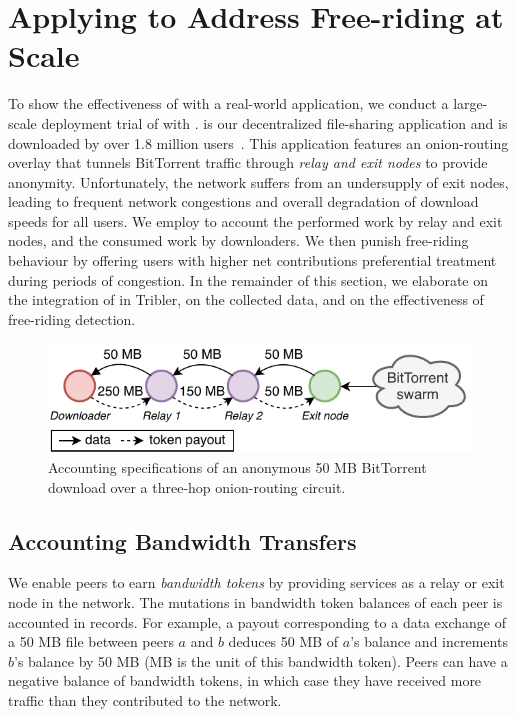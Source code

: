 \section{Applying \TrustChain{} to Address Free-riding at Scale}
\label{sec:deployment}
To show the effectiveness of \TrustChain{} with a real-world application, we conduct a large-scale deployment trial of \TrustChain{} with \Tribler{}.
\Tribler{} is our decentralized file-sharing application and is downloaded by over 1.8 million users~\cite{pouwelse2008tribler}.
This application features an onion-routing overlay that tunnels BitTorrent traffic through \emph{relay and exit nodes} to provide anonymity.
Unfortunately, the \Tribler{} network suffers from an undersupply of exit nodes, leading to frequent network congestions and overall degradation of download speeds for all users.
We employ \TrustChain{} to account the performed work by relay and exit nodes, and the consumed work by downloaders.
We then punish free-riding behaviour by offering users with higher net contributions preferential treatment during periods of congestion.
In the remainder of this section, we elaborate on the integration of \TrustChain{} in Tribler, on the collected data, and on the effectiveness of free-riding detection.

\begin{figure}[t]
	\centering
	\includegraphics[width=.8\linewidth]{trustchain/assets/payouts}
	\caption{Accounting specifications of an anonymous 50 MB BitTorrent download over a three-hop onion-routing circuit.}
	\label{fig:payouts}
\end{figure}

\subsection{Accounting Bandwidth Transfers}
We enable peers to earn \emph{bandwidth tokens} by providing services as a relay or exit node in the \Tribler{} network.
The mutations in bandwidth token balances of each peer is accounted in \TrustChain{} records.
For example, a payout corresponding to a data exchange of a 50 MB file between peers $ a $ and $ b $ deduces 50 MB of $ a $'s balance and increments $ b $'s balance by 50 MB (MB is the unit of this bandwidth token).
Peers can have a negative balance of bandwidth tokens, in which case they have received more traffic than they contributed to the network.

